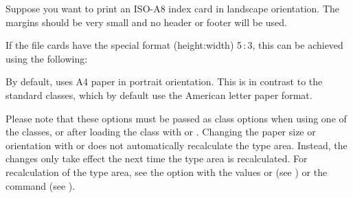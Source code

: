 \begin{Example}
 Suppose you want to print an ISO-A8 index card in landscape orientation. The
 margins should be very small and no header or footer will be used.
  If the file cards have the special format (height:width)
  5\,:\,3, this can be achieved using the following:
\end{Example}

By default, {\KOMAScript} uses A4 paper in portrait orientation. This is in
contrast to the standard classes,
which by default use the American letter paper format.

Please note that these options must be passed as class
options when using one of the {\KOMAScript} classes, or after loading the
class with  or
. Changing the paper size or orientation
with  or
 does not automatically recalculate the type area. Instead, the changes
only take effect the next time the type area is recalculated. For
recalculation of the type area, see the
\hyperref[desc:\LabelBase.option.DIV.last]{} option with the
values \hyperref[desc:\LabelBase.option.DIV.last]{} or
\hyperref[desc:\LabelBase.option.DIV.current]{} (see
) or the
 command (see
).%
\EndIndexGroup


